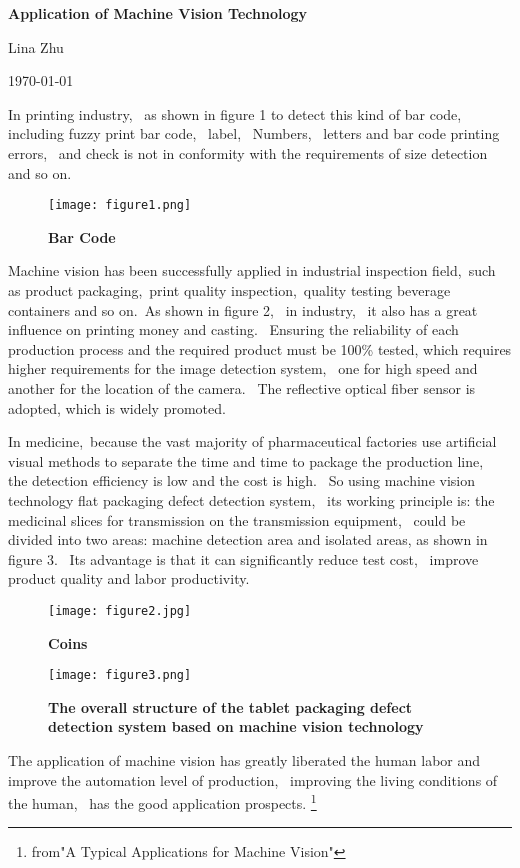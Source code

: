 \documentclass{article}
\begin{document}
	
	\begin{center}
		
		{\bfseries \LARGE Application of Machine Vision Technology} 
		
	\end{center}
	\begin{center}
		Lina Zhu
	\end{center}
	\begin{center}
		\today
	\end{center}
	
	\par  In printing industry,~ as shown in figure 1 to detect this kind of bar code,~ including
	fuzzy print bar code,~ label,~ Numbers,~ letters and bar code printing errors,~ and check is
	not in conformity with the requirements of size detection and so on.
\begin{figure}[htp]
	\centering
	\texttt{[image: figure1.png]}
	\caption{\bfseries{Bar Code}}\label{pic1}
		\end{figure}
	\par Machine vision has been successfully applied in industrial inspection field,~such as product
	packaging,~print quality inspection,~quality testing beverage containers and so on.~As shown in
	figure 2,~ in industry, ~it also has a great influence on printing money and casting.~ Ensuring 
	the reliability of each production process and the required product must be 100\% tested, which 
	requires higher requirements for the image detection system, ~one for high speed and another for
	the location of the camera.~ The reflective optical fiber sensor is adopted, which is widely promoted.
	\par In medicine,~because the vast majority of pharmaceutical factories use artificial visual methods
	to separate the time and time to package the production line,~ the detection efficiency is low and
	the cost is high.~ So using machine vision technology flat packaging defect detection system, ~its
	working principle is: the medicinal slices for transmission on the transmission equipment, ~could
	be divided into two areas: machine detection area and isolated areas, as shown in figure 3. ~Its
	advantage is that it can significantly reduce test cost, ~improve product quality and labor productivity.
	\begin{figure}[htp]
		\centering
		\texttt{[image: figure2.jpg]}
		\caption{\bfseries{Coins}}\label{pic2}
			\centering
		\texttt{[image: figure3.png]}
		\caption{	\bfseries{The overall structure of the tablet packaging defect detection system based on machine vision technology}}\label{pic3}
	
	\end{figure}
	\par The application of machine vision has greatly liberated the human labor and improve the 
	automation level of production, ~improving the living conditions of the human,~ has the good 
	application prospects. 
	\footnote{from"A Typical Applications for Machine Vision"} 
	
\end{document}
